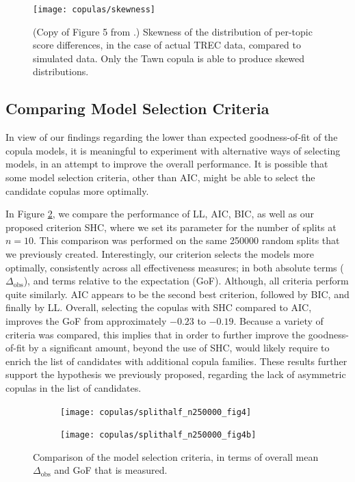 \begin{figure}[t]
	\centering	
	\texttt{[image: copulas/skewness]}
	\caption{(Copy of Figure 5 from \cite{Urbano2021}.) Skewness of the distribution of per-topic score differences, in the case of actual TREC data, compared to simulated data. Only the Tawn copula is able to produce skewed distributions.}
	\label{fig:skewness}
\end{figure}

\subsection{Comparing Model Selection Criteria}

In view of our findings regarding the lower than expected goodness-of-fit of the copula models, it is meaningful to experiment with alternative ways of selecting models, in an attempt to improve the overall performance. It is possible that some model selection criteria, other than AIC, might be able to select the candidate copulas more optimally.

In Figure \ref{fig:copulas-splithalf-plot-4}, we compare the performance of LL, AIC, BIC, as well as our proposed criterion SHC, where we set its parameter for the number of splits at $n=10$. This comparison was performed on the same \num{250000} random splits that we previously created. Interestingly, our criterion selects the models more optimally, consistently across all effectiveness measures; in both absolute terms ($\Delta_{\text{obs}}$), and terms relative to the expectation (GoF). Although, all criteria perform quite similarly. AIC appears to be the second best criterion, followed by BIC, and finally by LL. Overall, selecting the copulas with SHC compared to AIC, improves the GoF from approximately $-0.23$ to $-0.19$. Because a variety of criteria was compared, this implies that in order to further improve the goodness-of-fit by a significant amount, beyond the use of SHC, would likely require to enrich the list of candidates with additional copula families. These results further support the hypothesis we previously proposed, regarding the lack of asymmetric copulas in the list of candidates. 

\begin{figure}[t]
	\begin{subfigure}{1\textwidth}
		\texttt{[image: copulas/splithalf\_n250000\_fig4]}
	\end{subfigure} \newline
	\begin{subfigure}{1\textwidth}
		\texttt{[image: copulas/splithalf\_n250000\_fig4b]}
	\end{subfigure}
	\caption{Comparison of the model selection criteria, in terms of overall mean $\Delta_{\text{obs}}$ and GoF that is measured.}
	\label{fig:copulas-splithalf-plot-4}
\end{figure}

